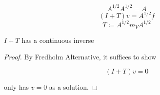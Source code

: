 \begin{fproposition}
    \[A^{1/2}A^{1/2}=A\]
    \[(I+T)v=A^{1/2}f\]
    \[T\coloneqq A^{1/2}m_V A^{1/2}\]
\end{fproposition}

\begin{fproposition}
    $I+T$ has a continuous inverse
\end{fproposition}

\begin{proof}
    By Fredholm Alternative, it suffices to show 

    \[(I+T)v=0\]

    only has $v=0$ as a solution.

\end{proof}